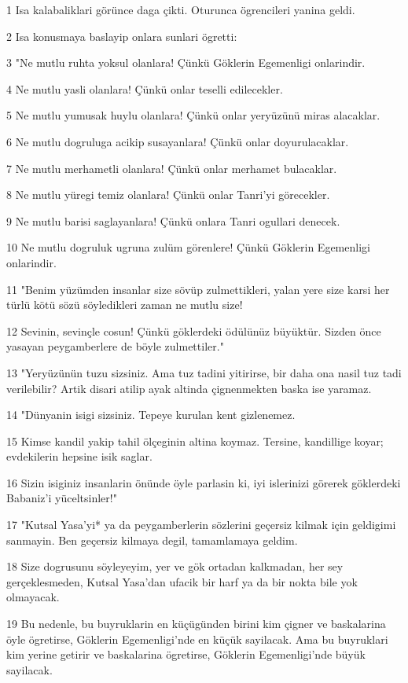\par 1 Isa kalabaliklari görünce daga çikti. Oturunca ögrencileri yanina geldi.
\par 2 Isa konusmaya baslayip onlara sunlari ögretti:
\par 3 "Ne mutlu ruhta yoksul olanlara! Çünkü Göklerin Egemenligi onlarindir.
\par 4 Ne mutlu yasli olanlara! Çünkü onlar teselli edilecekler.
\par 5 Ne mutlu yumusak huylu olanlara! Çünkü onlar yeryüzünü miras alacaklar.
\par 6 Ne mutlu dogruluga acikip susayanlara! Çünkü onlar doyurulacaklar.
\par 7 Ne mutlu merhametli olanlara! Çünkü onlar merhamet bulacaklar.
\par 8 Ne mutlu yüregi temiz olanlara! Çünkü onlar Tanri'yi görecekler.
\par 9 Ne mutlu barisi saglayanlara! Çünkü onlara Tanri ogullari denecek.
\par 10 Ne mutlu dogruluk ugruna zulüm görenlere! Çünkü Göklerin Egemenligi onlarindir.
\par 11 "Benim yüzümden insanlar size sövüp zulmettikleri, yalan yere size karsi her türlü kötü sözü söyledikleri zaman ne mutlu size!
\par 12 Sevinin, sevinçle cosun! Çünkü göklerdeki ödülünüz büyüktür. Sizden önce yasayan peygamberlere de böyle zulmettiler."
\par 13 "Yeryüzünün tuzu sizsiniz. Ama tuz tadini yitirirse, bir daha ona nasil tuz tadi verilebilir? Artik disari atilip ayak altinda çignenmekten baska ise yaramaz.
\par 14 "Dünyanin isigi sizsiniz. Tepeye kurulan kent gizlenemez.
\par 15 Kimse kandil yakip tahil ölçeginin altina koymaz. Tersine, kandillige koyar; evdekilerin hepsine isik saglar.
\par 16 Sizin isiginiz insanlarin önünde öyle parlasin ki, iyi islerinizi görerek göklerdeki Babaniz'i yüceltsinler!"
\par 17 "Kutsal Yasa'yi* ya da peygamberlerin sözlerini geçersiz kilmak için geldigimi sanmayin. Ben geçersiz kilmaya degil, tamamlamaya geldim.
\par 18 Size dogrusunu söyleyeyim, yer ve gök ortadan kalkmadan, her sey gerçeklesmeden, Kutsal Yasa'dan ufacik bir harf ya da bir nokta bile yok olmayacak.
\par 19 Bu nedenle, bu buyruklarin en küçügünden birini kim çigner ve baskalarina öyle ögretirse, Göklerin Egemenligi'nde en küçük sayilacak. Ama bu buyruklari kim yerine getirir ve baskalarina ögretirse, Göklerin Egemenligi'nde büyük sayilacak.
